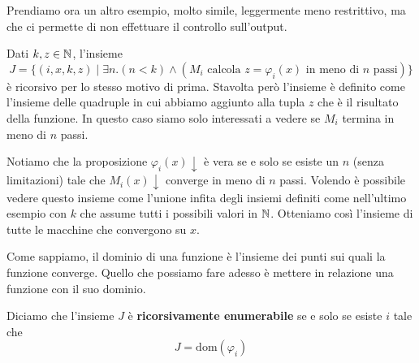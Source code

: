 Prendiamo ora un altro esempio, molto simile, leggermente meno
restrittivo, ma che ci permette di non effettuare il controllo
sull'output.

\begin{example}
	Dati $k, z \in \mathbb{N}$, l'insieme
	\[
		J = \{ (i,x,k,z) \mid \exists n . (n < k)
		\land (M_i \text{ calcola } z = \varphi_i (x)
		\text{ in meno di } n \text{ passi}) \}
	\]
	è ricorsivo per lo stesso motivo di prima. Stavolta però
	l'insieme è definito come l'insieme delle quadruple in cui
	abbiamo aggiunto alla tupla $z$ che è il risultato della
	funzione. In questo caso siamo solo interessati a vedere se
	$M_i$ termina in meno di $n$ passi.
\end{example}

Notiamo che la proposizione $\varphi_i (x) \downarrow$ è vera se
e solo se esiste un $n$ (senza limitazioni) tale che
$M_i(x) \downarrow$ converge in meno di $n$ passi. Volendo è
possibile vedere questo insieme come l'unione infita degli
insiemi definiti come nell'ultimo esempio con $k$ che assume
tutti i possibili valori in $\mathbb{N}$. Otteniamo così l'insieme di
tutte le macchine che convergono su $x$.

Come sappiamo, il dominio di una funzione è l'insieme dei punti
sui quali la funzione converge. Quello che possiamo fare adesso
è mettere in relazione una funzione con il suo dominio.

\begin{definition} \label{def: rec_enum}
	Diciamo che l'insieme $J$ è \textbf{ricorsivamente enumerabile}
	se e solo se esiste $i$ tale che
	\[ J = \text{dom}(\varphi_i) \]
\end{definition}

